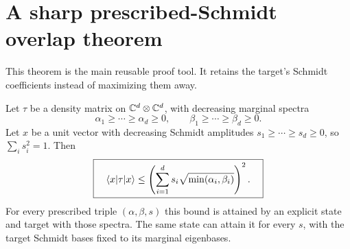 \section{A sharp prescribed-Schmidt overlap theorem}\label{sec:weighted}
This theorem is the main reusable proof tool. It retains the target's Schmidt coefficients instead of maximizing them away.

\begin{theorem}\label{thm:weighted}
Let $\tau$ be a density matrix on $\mathbb C^d\otimes\mathbb C^d$, with decreasing marginal spectra
\[
 \alpha_1\ge\cdots\ge\alpha_d\ge0,\qquad
 \beta_1\ge\cdots\ge\beta_d\ge0.
\]
Let $x$ be a unit vector with decreasing Schmidt amplitudes $s_1\ge\cdots\ge s_d\ge0$, so $\sum_i s_i^2=1$. Then
\begin{equation}\label{eq:weighted}
 \boxed{\quad\langle x\rvert\tau\lvert x\rangle\le
 \left(\sum_{i=1}^d s_i\sqrt{\min(\alpha_i,\beta_i)}\right)^2.\quad}
\end{equation}
For every prescribed triple $(\alpha,\beta,s)$ this bound is attained by an explicit state and target with those spectra. The same state can attain it for every $s$, with the target Schmidt bases fixed to its marginal eigenbases.
\end{theorem}

